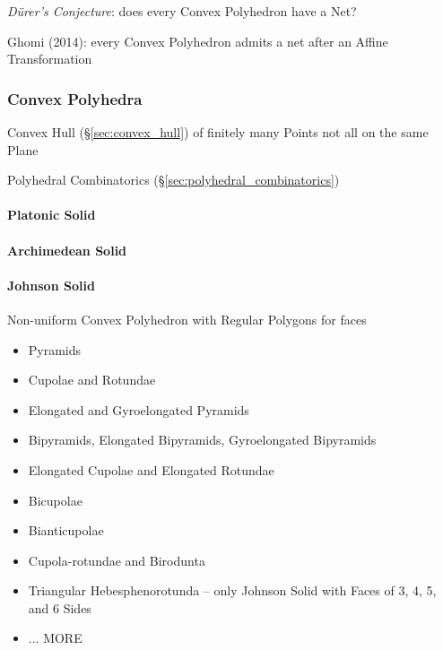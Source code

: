\emph{D\"urer's Conjecture}: does every Convex Polyhedron have a Net?

Ghomi (2014): every Convex Polyhedron admits a net after an Affine
Transformation



\subsubsection{Convex Polyhedra}\label{sec:convex_polyhedra}

Convex Hull (\S\ref{sec:convex_hull}) of finitely many Points not all on the
same Plane

\fist Polyhedral Combinatorics (\S\ref{sec:polyhedral_combinatorics})



\paragraph{Platonic Solid}\label{sec:platonic_solid}\hfill

\paragraph{Archimedean Solid}\label{sec:archimedean_solid}\hfill

\paragraph{Johnson Solid}\label{sec:johnson_solid}\hfill

Non-uniform Convex Polyhedron with Regular Polygons for faces

\begin{itemize}
  \item Pyramids
  \item Cupolae and Rotundae
  \item Elongated and Gyroelongated Pyramids
  \item Bipyramids, Elongated Bipyramids, Gyroelongated Bipyramids
  \item Elongated Cupolae and Elongated Rotundae
  \item Bicupolae
  \item Bianticupolae
  \item Cupola-rotundae and Birodunta
  \item Triangular Hebesphenorotunda -- only Johnson Solid with Faces of 3, 4,
    5, and 6 Sides
  \item ... MORE
\end{itemize}



